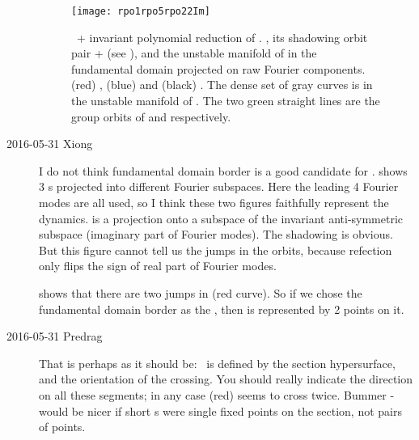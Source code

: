 \begin{description}
\begin{figure} %
  \centering
  \texttt{[image: rpo1rpo5rpo22Im]}
  \caption{
    \SFslice\ + invariant polynomial  reduction of .
    , its shadowing orbit pair + (see
    ), and the unstable manifold of  in the
    fundamental domain projected on raw Fourier components. (red) ,
    (blue)  and (black) . The dense set of gray curves is in
    the unstable manifold of . The two green straight lines are the
    group orbits of  and  respectively.
  }
  \label{fig:rpo1522a}
\end{figure}


\item[2016-05-31 Xiong]
I do not think
fundamental domain border is a good candidate for \PoincSec.
 shows 3 \rpo s projected into different Fourier subspaces.
Here the leading 4 Fourier modes are all used, so I think these two figures
faithfully represent the dynamics.  is a projection onto a subspace
of the invariant anti-symmetric subspace (imaginary part of Fourier modes). The
shadowing is obvious. But this figure cannot tell us the jumps in the orbits,
because refection only flips the sign of real part of Fourier modes.

 shows
that there are two jumps in  (red curve). So if we chose the fundamental
domain border as the \PoincSec, then  is represented by 2 points on
it.


\item[2016-05-31 Predrag]
That is perhaps as it should be: \PoincSec\ is defined by the section
hypersurface, and the orientation of the crossing. You should really indicate
the direction on all these segments; in any case  (red)
seems to cross twice. Bummer - would be nicer if short \po s were
single fixed points on the section, not pairs of points.


\end{description}
